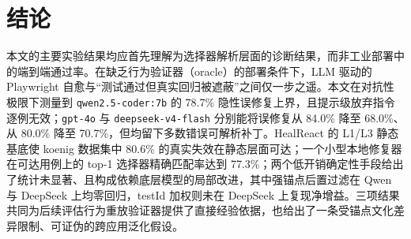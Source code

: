 \section{结论}
\label{sec:conclusion}

本文的主要实验结果均应首先理解为选择器解析层面的诊断结果，而非工业部署中的端到端通过率。在缺乏行为验证器（oracle）的部署条件下，LLM 驱动的 Playwright 自愈与“测试通过但真实回归被遮蔽”之间仅一步之遥。本文在对抗性极限下测量到 \texttt{qwen2.5-coder:7b} 的 78.7\% 隐性误修复上界，且提示级放弃指令逐例无效；\texttt{gpt-4o} 与 \texttt{deepseek-v4-flash} 分别能将误修复从 84.0\% 降至 68.0\%、从 80.0\% 降至 70.7\%，但均留下多数错误可解析补丁。HealReact 的 L1/L3 静态基底使 koenig 数据集中 80.6\% 的真实失效在静态层面可达；一个小型本地修复器在可达用例上的 top-1 选择器精确匹配率达到 77.3\%；两个低开销确定性手段给出了统计未显著、且构成依赖底层模型的局部改进，其中强锚点后置过滤在 Qwen 与 DeepSeek 上均零回归，testId 加权则未在 DeepSeek 上复现净增益。三项结果共同为后续评估行为重放验证器提供了直接经验依据，也给出了一条受锚点文化差异限制、可证伪的跨应用泛化假设。
